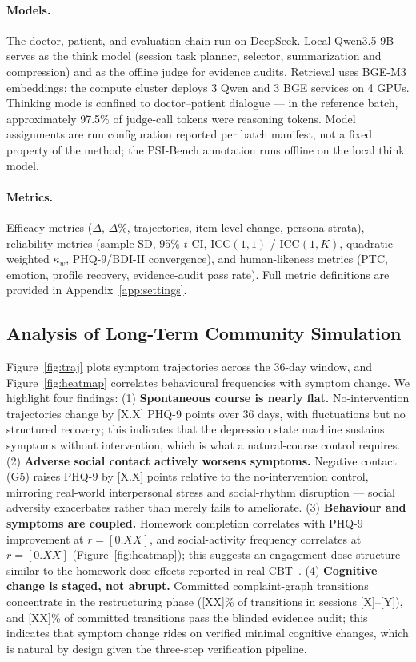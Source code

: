 \documentclass[10pt]{article}
\begin{document}
\paragraph{Models.}
The doctor, patient, and evaluation chain run on DeepSeek.
Local Qwen3.5-9B serves as the think model (session task planner, selector, summarization and compression) and as the offline judge for evidence audits.
Retrieval uses BGE-M3 embeddings; the compute cluster deploys 3 Qwen and 3 BGE services on 4 GPUs.
Thinking mode is confined to doctor--patient dialogue --- in the reference batch, approximately 97.5\% of judge-call tokens were reasoning tokens.
Model assignments are run configuration reported per batch manifest, not a fixed property of the method; the PSI-Bench annotation runs offline on the local think model.

\paragraph{Metrics.}
Efficacy metrics ($\Delta$, $\Delta\%$, trajectories, item-level change, persona strata), reliability metrics (sample SD, 95\% $t$-CI, ICC$(1,1)$ / ICC$(1,K)$, quadratic weighted $\kappa_w$, PHQ-9/BDI-II convergence), and human-likeness metrics (PTC, emotion, profile recovery, evidence-audit pass rate).
Full metric definitions are provided in Appendix~\ref{app:settings}.

\subsection{Analysis of Long-Term Community Simulation}\label{sec:simanalysis}

Figure~\ref{fig:traj} plots symptom trajectories across the 36-day window, and Figure~\ref{fig:heatmap} correlates behavioural frequencies with symptom change.
We highlight four findings:
(1) \textbf{Spontaneous course is nearly flat.} No-intervention trajectories change by [X.X] PHQ-9 points over 36 days, with fluctuations but no structured recovery; this indicates that the depression state machine sustains symptoms without intervention, which is what a natural-course control requires.
(2) \textbf{Adverse social contact actively worsens symptoms.} Negative contact (G5) raises PHQ-9 by [X.X] points relative to the no-intervention control, mirroring real-world interpersonal stress and social-rhythm disruption --- social adversity exacerbates rather than merely fails to ameliorate.
(3) \textbf{Behaviour and symptoms are coupled.} Homework completion correlates with PHQ-9 improvement at $r = [0.XX]$, and social-activity frequency correlates at $r = [0.XX]$ (Figure~\ref{fig:heatmap}); this suggests an engagement-dose structure similar to the homework-dose effects reported in real CBT~\citep{burns2001}.
(4) \textbf{Cognitive change is staged, not abrupt.} Committed complaint-graph transitions concentrate in the restructuring phase ([XX]\% of transitions in sessions [X]--[Y]), and [XX]\% of committed transitions pass the blinded evidence audit; this indicates that symptom change rides on verified minimal cognitive changes, which is natural by design given the three-step verification pipeline.
\end{document}
